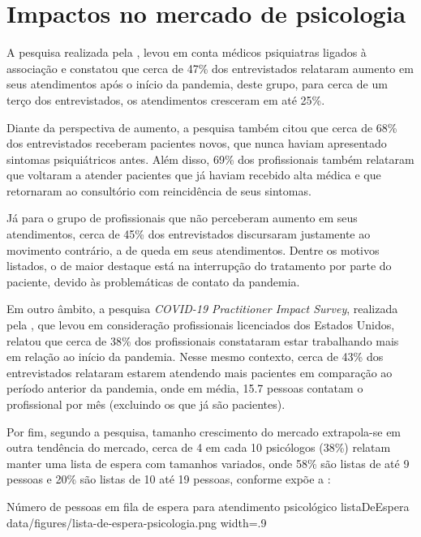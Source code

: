 \section{Impactos no mercado de psicologia}
\label{sec:impactoPsicologia}

A pesquisa realizada pela , levou em conta médicos psiquiatras ligados à associação e constatou que cerca de 47\% dos entrevistados relataram aumento em seus atendimentos após o início da pandemia, deste grupo, para cerca de um terço dos entrevistados, os atendimentos cresceram em até 25\%.

Diante da perspectiva de aumento, a pesquisa também citou que cerca de 68\% dos entrevistados receberam pacientes novos, que nunca haviam apresentado sintomas psiquiátricos antes. Além disso, 69\% dos profissionais também relataram que voltaram a atender pacientes que já haviam recebido alta médica e que retornaram ao consultório com reincidência de seus sintomas.

Já para o grupo de profissionais que não perceberam aumento em seus atendimentos, cerca de 45\% dos entrevistados discursaram justamente ao movimento contrário, a de queda em seus atendimentos. Dentre os motivos listados, o de maior destaque está na interrupção do tratamento por parte do paciente, devido às problemáticas de contato da pandemia.

Em outro âmbito, a pesquisa \textit{COVID-19 Practitioner Impact Survey}, realizada pela , que levou em consideração profissionais licenciados dos Estados Unidos, relatou que cerca de 38\% dos profissionais constataram estar trabalhando mais em relação ao início da pandemia. Nesse mesmo contexto, cerca de 43\% dos entrevistados relataram estarem atendendo mais pacientes em comparação ao período anterior da pandemia, onde em média, 15.7 pessoas contatam o profissional por mês (excluindo os que já são pacientes).

Por fim, segundo a pesquisa, tamanho crescimento do mercado extrapola-se em outra tendência do mercado, cerca de 4 em cada 10 psicólogos (38\%) relatam manter uma lista de espera com tamanhos variados, onde 58\% são listas de até 9 pessoas e 20\% são listas de 10 até 19 pessoas, conforme expõe a :

\image
    {Número de pessoas em fila de espera para atendimento psicológico}
    {listaDeEspera}
    {data/figures/lista-de-espera-psicologia.png}
    {width=.9\textwidth}
    {}